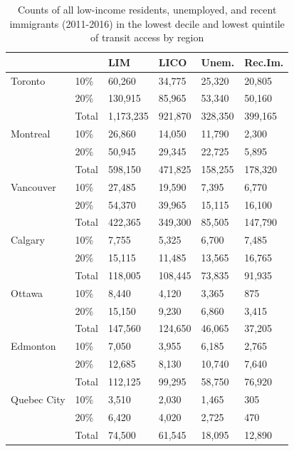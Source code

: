 \documentclass[11 pt, letterpaper]{article}
\begin{document}
{\begin{table}[H]
	\vspace{2mm}
	\centering
	\renewcommand{\arraystretch}{0.75} %
	\caption{Counts of all low-income residents, unemployed, and recent immigrants (2011-2016) in the lowest decile and lowest quintile of transit access by region}
	\label{tab_decile}
	\begin{tabular}{ll|llll}
		& & LIM     & LICO    & Unem.   & Rec.Im. \\ \hline
		Toronto     & 10\%  & 60,260    & 34,775    & 25,320  & 20,805  \\
		& 20\%  & 130,915   & 85,965    & 53,340  & 50,160  \\
		& Total & 1,173,235 & 921,870   & 328,350 & 399,165 \\ \hline
		Montreal    & 10\%  & 26,860    & 14,050    & 11,790  & 2,300   \\
		& 20\%  & 50,945    & 29,345    & 22,725  & 5,895   \\
		& Total & 598,150   & 471,825   & 158,255 & 178,320 \\ \hline
		Vancouver   & 10\%  & 27,485    & 19,590    & 7,395   & 6,770   \\
		& 20\%  & 54,370    & 39,965    & 15,115  & 16,100  \\
		& Total & 422,365   & 349,300   & 85,505  & 147,790 \\ \hline
		Calgary     & 10\%  & 7,755     & 5,325     & 6,700   & 7,485   \\
		& 20\%  & 15,115    & 11,485    & 13,565  & 16,765  \\
		& Total & 118,005   & 108,445   & 73,835  & 91,935  \\ \hline
		Ottawa      & 10\%  & 8,440     & 4,120     & 3,365   & 875     \\
		& 20\%  & 15,150    & 9,230     & 6,860   & 3,415   \\
		& Total & 147,560   & 124,650   & 46,065  & 37,205  \\ \hline
		Edmonton    & 10\%  & 7,050     & 3,955     & 6,185   & 2,765   \\
		& 20\%  & 12,685    & 8,130     & 10,740  & 7,640   \\
		& Total & 112,125   & 99,295    & 58,750  & 76,920  \\ \hline
		Quebec City & 10\%  & 3,510     & 2,030     & 1,465   & 305     \\
		& 20\%  & 6,420     & 4,020     & 2,725   & 470     \\
		& Total & 74,500    & 61,545    & 18,095  & 12,890  \\ \hline

\end{tabular}
\end{table}}
\end{document}
